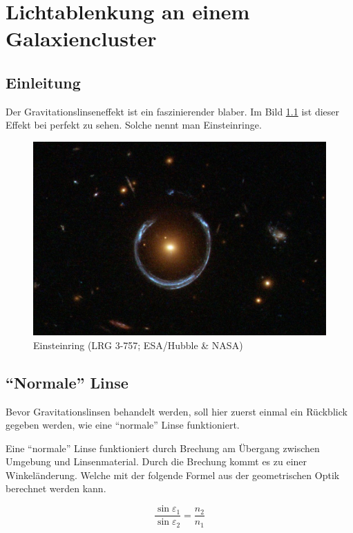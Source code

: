 \chapter{Lichtablenkung an einem Galaxiencluster\label{chapter:thema}}
\begin{refsection}

\section{Einleitung}
Der Gravitationslinseneffekt ist ein faszinierender blaber.  Im Bild
\ref{fig:lrg3-757} ist dieser Effekt bei perfekt zu sehen.  Solche
nennt man Einsteinringe.

\begin{figure}
  \centering
  \includegraphics[width=\textwidth]{cluster/images/LRG_3-757}
  \caption{Einsteinring (LRG 3-757; ESA/Hubble \& NASA)}
  \label{fig:lrg3-757}
\end{figure}

\section{``Normale'' Linse}
Bevor Gravitationslinsen behandelt werden, soll hier zuerst einmal ein
Rückblick gegeben werden, wie eine ``normale'' Linse funktioniert.

Eine ``normale'' Linse funktioniert durch Brechung am Übergang
zwischen Umgebung und Linsenmaterial.  Durch die Brechung kommt es zu
einer Winkeländerung.  Welche mit der folgende Formel aus der
geometrischen Optik berechnet werden kann.

\begin{equation}
  \frac{\sin \varepsilon_1}{\sin \varepsilon_2} = \frac{n_2}{n_1}
\end{equation}


\end{refsection}
